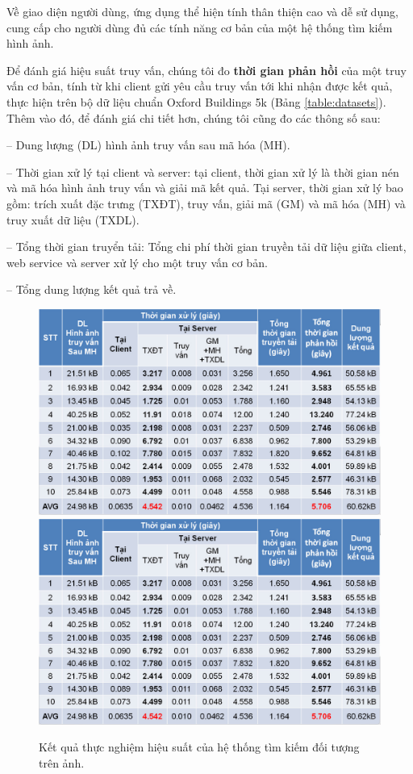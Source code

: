 	Về giao diện người dùng, ứng dụng thể hiện tính thân thiện cao và dễ sử dụng, cung cấp cho người dùng đủ các tính năng cơ bản của một hệ thống tìm kiếm hình ảnh.
	
	Để đánh giá hiệu suất truy vấn, chúng tôi đo \textbf{thời gian phản hồi} của một truy vấn cơ bản, tính từ khi client gửi yêu cầu truy vấn tới khi nhận được kết quả, thực hiện trên bộ dữ liệu chuẩn Oxford Buildings 5k (Bảng \ref{table:datasets}). Thêm vào đó, để đánh giá chi tiết hơn, chúng tôi cũng đo các thông số sau:
	
	-- Dung lượng (DL) hình ảnh truy vấn sau mã hóa (MH).
	
	-- Thời gian xử lý tại client và server: tại client, thời gian xử lý là thời gian nén và mã hóa hình ảnh truy vấn và giải mã kết quả. Tại server, thời gian xử lý bao gồm: trích xuất đặc trưng (TXĐT), truy vấn, giải mã (GM) và mã hóa (MH) và truy xuất dữ liệu (TXDL).
	
	-- Tổng thời gian truyển tải: Tổng chi phí thời gian truyền tải dữ liệu giữa client, web service và server xử lý cho một truy vấn cơ bản.
	
	-- Tổng dung lượng kết quả trả về.
	
\begin{figure}[!htbp]
  \begin{center}
    \leavevmode
    \ifpdf
      \includegraphics[scale=0.3]{app_experimental}
    \else
      \includegraphics[scale=0.3]{app_experimental}
    \fi
    \caption[Kết quả thực nghiệm hiệu suất của hệ thống tìm kiếm đối tượng trên ảnh.]{Kết quả thực nghiệm hiệu suất của hệ thống tìm kiếm đối tượng trên ảnh.}
    \label{FigAppExperimental}
  \end{center}
\end{figure}
		
